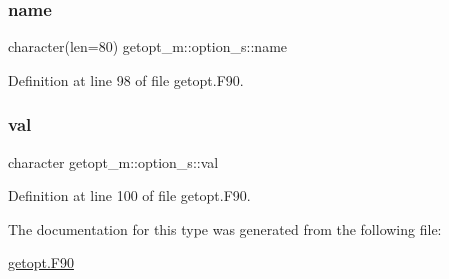 \subsubsection{\texorpdfstring{name}{name}}
{\footnotesize\ttfamily character(len=80) getopt\+\_\+m\+::option\+\_\+s\+::name}



Definition at line 98 of file getopt.\+F90.

\mbox{\label{structgetopt__m_1_1option__s_a25ab80bd4f202b256c65c31ea7d1798b}} 
\subsubsection{\texorpdfstring{val}{val}}
{\footnotesize\ttfamily character getopt\+\_\+m\+::option\+\_\+s\+::val}



Definition at line 100 of file getopt.\+F90.



The documentation for this type was generated from the following file\+:\begin{DoxyCompactItemize}
\item 
\mbox{\hyperlink{getopt_8_f90}{getopt.\+F90}}\end{DoxyCompactItemize}
